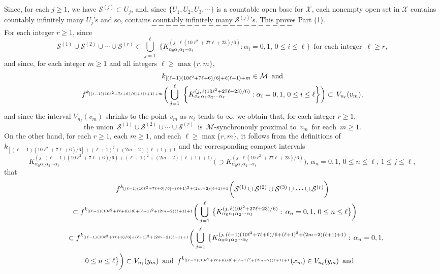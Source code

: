 \documentclass[12pt]{article}
\newcommand{\al}{\alpha}
\begin{document}
Since, for each $j \ge 1$, we have $\mathcal S^{(j)} \subset U_j$, and, since $\{ U_1, U_2, U_3, \cdots \}$ is a countable open base for $\mathcal X$, each nonempty open set in $\mathcal X$ contains countably infinitely many $U_j$'s and so, contains countably infinitely many $\mathcal S^{(j)}$'s.  This proves Part (1).  
$$--------------------$$
\indent For each integer $r \ge 1$, since 
$$
\mathcal S^{(1)} \cup \mathcal S^{(2)} \cup \cdots \cup \mathcal S^{(r)} \subset \bigcup_{j=1}^\ell \,\, \bigg\{ K_{\al_0\al_1\al_2\cdots\al_\ell}^{(j, \, \ell(10\ell^2+27\ell+23)/6)}: \al_i = 0, 1, \, 0 \le i \le \ell \bigg\} \,\,\, \text{for each integer} \,\,\, \ell \ge r,
$$
and since, for each integer $m \ge 1$ and all integers $\ell \ge \max \{ r, m \}$,   
\begin{multline*}
$$
k_{[(\ell-1)(10\ell^2+7\ell+6)/6]+\ell(\ell+1)+m} \in \mathcal M \,\,\, \text{and} \\
f^{k_{[(\ell-1)(10\ell^2+7\ell+6)/6]+\ell(\ell+1)+m}}\bigg(\bigcup_{j=1}^\ell \,\, \bigg\{K_{\al_0\al_1\al_2\cdots\al_\ell}^{(j, \, \ell(10\ell^2+27\ell+23)/6)}:  \al_i = 0, 1, \, 0 \le i \le \ell \bigg\}\bigg) \subset \, V_{n_\ell}(v_m),
$$
\end{multline*}
and since the interval $V_{n_\ell}(v_m)$ shrinks to the point $v_m$ as $n_\ell$ tends to $\infty$, we obtain that, for each integer $r \ge 1$, 
$$
\text{the union} \,\,\, \mathcal S^{(1)} \cup \mathcal S^{(2)} \cup \cdots \cup \mathcal S^{(r)} \,\,\, \text{is} \,\,\, \mathcal M\text{-synchronouly proximal to} \,\,\, v_m \,\,\, \text{for each} \,\,\, m \ge 1. 
$$
\indent On the other hand, for each $r \ge 1$, each $m \ge 1$, and each $\ell \ge \max \{ r, m \}$, it follows from the definitions of 
$k_{[(\ell-1)(10\ell^2+7\ell+6)/6]+(\ell+1)^2+(2m-2)(\ell+1)+1}$ and the corresponding compact intervals 
$$
K_{\al_0\al_1\al_2\cdots\al_\ell}^{(j, \, (\ell-1)(10\ell^2+7\ell+6)/6)+(\ell+1)^2+(2m-2)(\ell+1)+1)} \, \big(\supset K_{\al_0\al_1\al_2\cdots\al_\ell}^{(j, \, \ell(10\ell^2+27\ell+23)/6)}\big), \, \al_n = 0, 1, \, 0 \le n \le \ell, \, 1 \le j \le \ell, 
$$
that
\begin{multline*}
$$
f^{k_{[(\ell-1)(10\ell^2+7\ell+6)/6]+(\ell+1)^2+(2m-2)(\ell+1)+1}}\bigg(\mathcal S^{(1)} \cup \mathcal S^{(2)} \cup \mathcal S^{(3)} \cup \cdots \cup \mathcal S^{(r)}\bigg) \\
\subset f^{k_{[(\ell-1)(10\ell^2+7\ell+6)/6]+(\ell+1)^2+(2m-2)(\ell+1)+1}}\bigg(\bigcup_{j=1}^\ell \, \big\{ K_{\al_0\al_1\al_2\cdots\al_\ell}^{(j, \, \ell(10\ell^2+27\ell+23)/6)}: \, \al_n = 0, 1, \, 0 \le n \le \ell \big\}\bigg) \qquad\, \\ 
\,\,\,\,\,\, \subset f^{k_{[(\ell-1)(10\ell^2+7\ell+6)/6]+(\ell+1)^2+(2m-2)(\ell+1)+1}}\bigg(\bigcup_{j=1}^\ell \, \big\{ K_{\al_0\al_1\al_2\cdots\al_\ell}^{(j, \, (\ell-1)(10\ell^2+7\ell+6)/6+(\ell+1)^2+(2m-2)(\ell+1)+1)}: \, \al_n = 0, 1, \\
\qquad\, 0 \le n \le \ell \big\}\bigg) \subset V_{n_\ell}(y_m) \,\,\, \text{and} \,\,\, f^{k_{[(\ell-1)(10\ell^2+7\ell+6)/6]+(\ell+1)^2+(2m-2)(\ell+1)+1}}(x_m) \in V_{n_\ell}(y_m) \,\,\, \text{and} \qquad\quad \\ 
$$
\end{multline*}
\end{document}
